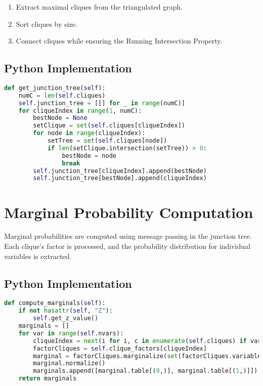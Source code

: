 \begin{enumerate}
    \item Extract maximal cliques from the triangulated graph.
    \item Sort cliques by size.
    \item Connect cliques while ensuring the Running Intersection Property.
\end{enumerate}

\subsection{Python Implementation}

\begin{lstlisting}[language=Python]
def get_junction_tree(self):
    numC = len(self.cliques)
    self.junction_tree = [[] for _ in range(numC)]
    for cliqueIndex in range(1, numC):
        bestNode = None
        setClique = set(self.cliques[cliqueIndex])
        for node in range(cliqueIndex):
            setTree = set(self.cliques[node])
            if len(setClique.intersection(setTree)) > 0:
                bestNode = node
                break
        self.junction_tree[cliqueIndex].append(bestNode)
        self.junction_tree[bestNode].append(cliqueIndex)
\end{lstlisting}

\section{Marginal Probability Computation}

Marginal probabilities are computed using message passing in the junction tree. Each clique's factor is processed, and the probability distribution for individual variables is extracted.

\subsection{Python Implementation}

\begin{lstlisting}[language=Python]
def compute_marginals(self):
    if not hasattr(self, "Z"):
        self.get_z_value()
    marginals = []
    for var in range(self.nvars):
        cliqueIndex = next(i for i, c in enumerate(self.cliques) if var in c)
        factorCliques = self.clique_factors[cliqueIndex]
        marginal = factorCliques.marginalize(set(factorCliques.variables) - {var})
        marginal.normalize()
        marginals.append([marginal.table[(0,)], marginal.table[(1,)]])
    return marginals
\end{lstlisting}

